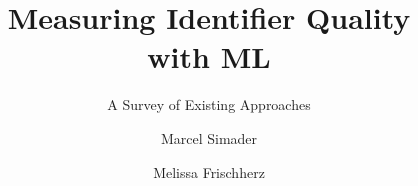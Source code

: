 \title[Identifier Quality Metrics]{Measuring Identifier Quality\\ with \acl{ML}}


\subtitle[A Survey]{A Survey of Existing Approaches}


\author[Simader \and Frischherz]{Marcel Simader \and Melissa Frischherz}




\date[2024-06-12]{}  %




\footer{\expandafter\notblank\expandafter{\insertsectionhead}{%
    \insertsectionhead\expandafter\notblank\expandafter{\insertsubsectionhead}{%
        ~--~\insertsubsectionhead%
    }{}}{}}

\footerdate{\insertshortdate} %

